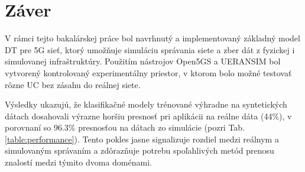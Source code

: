 \chapter{Záver}

V rámci tejto bakalárskej práce bol navrhnutý a implementovaný základný model DT pre 5G sieť, ktorý umožňuje simuláciu správania siete a zber dát z fyzickej i simulovanej infraštruktúry. Použitím nástrojov Open5GS a UERANSIM bol vytvorený kontrolovaný experimentálny priestor, v ktorom bolo možné testovať rôzne UC bez zásahu do reálnej siete. 

Výsledky ukazujú, že klasifikačné modely trénované výhradne na syntetických dátach dosahovali výrazne horšiu presnosť pri aplikácii na reálne dáta (44\%), v porovnaní so 96.3\% presnosťou na dátach zo simulácie (pozri Tab. \ref{table:performance}). Tento pokles jasne signalizuje rozdiel medzi reálnym a simulovaným správaním a zdôrazňuje potrebu spoľahlivých metód prenosu znalostí medzi týmito dvoma doménami.

